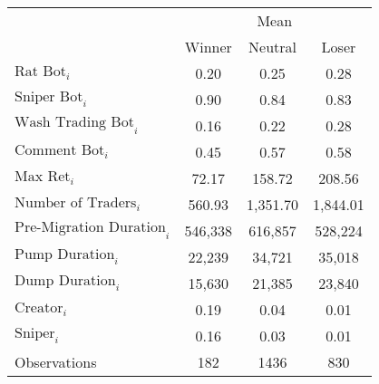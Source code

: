\begin{tabular}{lccc}
\toprule
& \multicolumn{3}{c}{Mean} \\
\cmidrule{2-4}
& Winner & Neutral & Loser \\
\midrule
$\text{Rat Bot}_{i}$ & 0.20 & 0.25 & 0.28 \\
$\text{Sniper Bot}_{i}$ & 0.90 & 0.84 & 0.83 \\
$\text{Wash Trading Bot}_{i}$ & 0.16 & 0.22 & 0.28 \\
$\text{Comment Bot}_{i}$ & 0.45 & 0.57 & 0.58 \\
$\text{Max Ret}_{i}$ & 72.17 & 158.72 & 208.56 \\
$\text{Number of Traders}_{i}$ & 560.93 & 1,351.70 & 1,844.01 \\
$\text{Pre-Migration Duration}_{i}$ & 546,338 & 616,857 & 528,224 \\
$\text{Pump Duration}_{i}$ & 22,239 & 34,721 & 35,018 \\
$\text{Dump Duration}_{i}$ & 15,630 & 21,385 & 23,840 \\
$\text{Creator}_{i}$ & 0.19 & 0.04 & 0.01 \\
$\text{Sniper}_{i}$ & 0.16 & 0.03 & 0.01 \\
\midrule
Observations & 182 & 1436 & 830 \\
\bottomrule
\end{tabular}